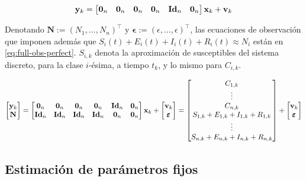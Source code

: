 \begin{equation} \label{eq:full-obs}
\mathbf{y}_{k} = 
\begin{bmatrix}\mathbf{0}_n & \mathbf{0}_n & \mathbf{0}_n & \mathbf{0}_n & \text{\textbf{Id}}_n & \mathbf{0}_n \end{bmatrix} \mathbf{x}_{k} + \mathbf{v}_k
\end{equation}

Denotando \(\mathbf{N} := (N_1, \dots, N_n)^{\top}\) y \(\pmb{\epsilon} := (\epsilon, \dots, \epsilon)^{\top}\), las ecuaciones de observación que imponen además que \(S_i(t) + E_i(t) + I_i(t) + R_i(t) \approx N_i\) están en \ref{eq:full-obs-perfect}. \(S_{i, k}\) denota la aproximación de susceptibles del sistema discreto, para la clase \(i\)-ésima, a tiempo \(t_k\), y lo mismo para \(C_{i,k}\).

\begin{equation} \label{eq:full-obs-perfect}
\begin{bmatrix}
\mathbf{y}_{k} \\
\mathbf{N}
\end{bmatrix} = 
\begin{bmatrix}
\mathbf{0}_n & \mathbf{0}_n & \mathbf{0}_n & \mathbf{0}_n & \text{\textbf{Id}}_n & \mathbf{0}_n \\
\text{\textbf{Id}}_n & \text{\textbf{Id}}_n & \text{\textbf{Id}}_n & \text{\textbf{Id}}_n & \mathbf{0}_n & \mathbf{0}_n \\
\end{bmatrix}
\mathbf{x}_{k} + 
\begin{bmatrix}
\mathbf{v}_k \\
\pmb{\epsilon}
\end{bmatrix} =
\begin{bmatrix}
C_{1,k} \\
\vdots \\
C_{n,k} \\
S_{1,k} + E_{1,k} + I_{1,k} + R_{1,k} \\
\vdots \\
S_{n,k} + E_{n,k} + I_{n,k} + R_{n,k}
\end{bmatrix}
 + 
\begin{bmatrix}
\mathbf{v}_k \\
\pmb{\epsilon}
\end{bmatrix}
\end{equation}


\subsection{Estimación de parámetros fijos}\label{met-subsec:fijos}


